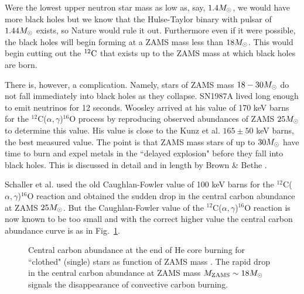 \documentclass[aps,twocolumn,preprintnumbers,%
superscriptaddress,floatfix]{revtex4}
\begin{document}
Were the lowest upper neutron star mass as low as, say, $1.4\mbox{$M_\odot$}$,  we would have more black holes but we know that the Hulse-Taylor binary with pulsar of $1.44\mbox{$M_\odot$}$ exists, so Nature would rule it out. Furthermore even if it were possible, the black holes will begin forming at a ZAMS mass less than $18\mbox{$M_\odot$}$. This would begin cutting out the ${^{12}}{\rm C}$ that exists up to the ZAMS mass at which black holes are born.
%

There is, however, a complication. Namely, stars of ZAMS mass $18-30\mbox{$M_\odot$}$ do not fall immediately into black holes as they collapse. SN1987A lived long enough to emit neutrinos for 12 seconds. Woosley arrived at his value of 170 keV barns for the $^{12}$C($\alpha,\gamma$)$^{16}$O process by reproducing observed abundances of ZAMS $25\mbox{$M_\odot$}$ to determine this value. His value is close to the Kunz et al. \cite{Kun01} $165\pm 50$ keV barns, the best measured value. The point is that ZAMS mass stars of up to $30 \mbox{$M_\odot$}$ have time to burn and expel metals in the ``delayed explosion" before they fall into black holes. This is discussed in detail and in length by Brown \& Bethe \cite{Bro94}.

Schaller et al. \cite{Sch92} used the old Caughlan-Fowler \cite{Cau88} value of 100 keV barns for the $^{12}$C($\alpha,\gamma$)$^{16}$O reaction and obtained the sudden drop in the central carbon abundance at ZAMS $25\mbox{$M_\odot$}$.
%
%
But the Caughlan-Fowler \cite{Cau88} value of the $^{12}$C($\alpha,\gamma$)$^{16}$O reaction is now known to be too small and with the correct higher value the central carbon abundance curve is as in Fig.~\ref{fig1}.

%
\begin{figure}[hb]
\begin{center}
{}
\vskip -0.5cm
\caption{ Central carbon abundance at the end of He core burning for
``clothed" (single) stars as function of ZAMS mass \cite{Bro01}.
The rapid drop in the central carbon abundance at ZAMS mass $M_{\rm ZAMS}\sim 18\mbox{$M_\odot$}$ signals the disappearance of convective carbon burning.  }
\label{fig1}
\end{center}
\end{figure}
\end{document}
